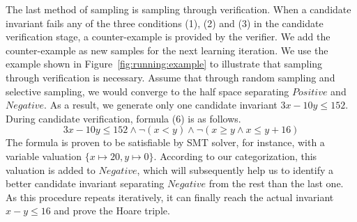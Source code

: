 The last method of sampling is sampling through verification. 
When a candidate invariant fails any of the three conditions (1), (2) and (3) in the candidate verification stage,
a counter-example is provided by the verifier. 
We add the counter-example as new samples for the next learning iteration. 
We use the example shown in Figure~\ref{fig:running:example} to illustrate that sampling through verification is necessary. 
Assume that through random sampling and selective sampling, we would converge to the half space separating $\mathit{Positive}$ and $\mathit{Negative}$. 
As a result, we generate only one candidate invariant $\mathit{3x-10y \leq 152}$. During candidate verification, formula (6) is as follows. 
\[
\mathit{3x-10y \leq 152 \land \neg (x < y) \land \neg (x \geq y \land x \leq y + 16)}
\]
The formula is proven to be satisfiable by SMT solver, for instance, with a variable valuation $\mathit{\{x \mapsto 20, y \mapsto 0\}}$. 
According to our categorization, this valuation is added to $\mathit{Negative}$, 
which will subsequently help us to identify a better candidate invariant separating $\mathit{Negative}$ from the rest than the last one.
As this procedure repeats iteratively, it can finally reach the actual invariant $\mathit{x - y \leq 16}$ and prove the Hoare triple.
